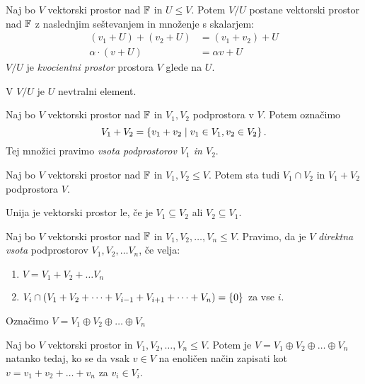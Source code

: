 \documentclass[12pt, a4paper]{article}
\begin{document}
\begin{izrek}
Naj bo $V$ vektorski prostor nad $\mathbb{F}$ in $U\leq V$. Potem $V/U$ postane vektorski prostor nad $\mathbb{F}$ z naslednjim seštevanjem in množenje s skalarjem:
\begin{align*}
(v_1+U)+(v_2+U)&=(v_1+v_2)+U
\\
\alpha\cdot(v+U)&=\alpha v+U
\end{align*}
$V/U$ je \emph{kvocientni prostor} prostora $V$ glede na $U$.
\end{izrek}

\obvs

\begin{opomba}
V $V/U$ je $U$ nevtralni element.
\end{opomba}

\begin{definicija}
Naj bo $V$ vektorski prostor nad $\mathbb{F}$ in $V_1,V_2$ podprostora v $V$. Potem označimo
\[
V_1+V_2=\left\{v_1+v_2\mid v_1\in V_1,v_2\in V_2\right\}.
\]
Tej množici pravimo \emph{vsota podprostorov $V_1$ in $V_2$}.
\end{definicija}

\begin{trditev}
Naj bo $V$ vektorski prostor nad $\mathbb{F}$ in $V_1,V_2\leq V$. Potem sta tudi $V_1\cap V_2$ in $V_1+V_2$ podprostora $V$.
\end{trditev}

\obvs

\begin{opomba}
Unija je vektorski prostor le, če je $V_1\subseteq V_2$ ali $V_2\subseteq V_1$.
\end{opomba}

\begin{definicija}
Naj bo $V$ vektorski prostor nad $\mathbb{F}$ in $V_1,V_2,\dots, V_n\leq V$. Pravimo, da je $V$ \emph{direktna vsota} podprostorov $V_1,V_2,\dots V_n$, če velja:

\begin{enumerate}[label=\arabic*)]
\item $V=V_1+V_2+\dots V_n$
\item $V_i\cap (V_1+V_2+\dots+V_{i-1}+V_{i+1}+\dots+V_n)=\left\{0\right\}$ za vse $i$.
\end{enumerate}

Označimo $V=V_1\oplus V_2\oplus\dots\oplus V_n$
\end{definicija}

\begin{izrek}
Naj bo $V$ vektorski prostor in $V_1,V_2,\dots, V_n\leq V$. Potem je $V=V_1\oplus V_2\oplus\dots\oplus V_n$ natanko tedaj, ko se da vsak $v\in V$ na enoličen način zapisati kot $v=v_1+v_2+\dots+v_n$ za $v_i\in V_i$.
\end{izrek}
\end{document}
